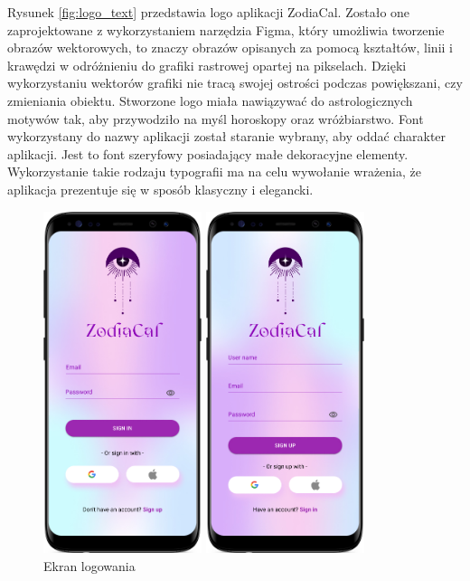 Rysunek \ref{fig:logo_text} przedstawia logo aplikacji ZodiaCal. Zostało one zaprojektowane z wykorzystaniem narzędzia Figma, który umożliwia tworzenie obrazów wektorowych, to znaczy obrazów opisanych za pomocą kształtów, linii i krawędzi w odróżnieniu do grafiki rastrowej opartej na pikselach. Dzięki wykorzystaniu wektorów grafiki nie tracą swojej ostrości
podczas powiększani, czy zmieniania obiektu. Stworzone logo miała nawiązywać do astrologicznych motywów tak, aby przywodziło na myśl horoskopy oraz wróżbiarstwo. Font wykorzystany do nazwy aplikacji został staranie wybrany, aby oddać charakter aplikacji. Jest to
font szeryfowy posiadający małe dekoracyjne elementy. Wykorzystanie takie rodzaju typografii ma na celu wywołanie wrażenia, że aplikacja prezentuje się w sposób klasyczny i elegancki.


\begin{figure}[t]
	\begin{minipage}{0.4\textwidth}
		\centering
		\includegraphics[height=10cm, keepaspectratio]{images/interfejs_figma/Sign_in}
		\caption{Ekran logowania}
		\label{fig:Sign-in}
	\end{minipage}
	\hfill
	\begin{minipage}{0.4\textwidth}
		\centering
		\includegraphics[height=10cm, keepaspectratio]{images/interfejs_figma/Sign_up}

\end{minipage}
\end{figure}

